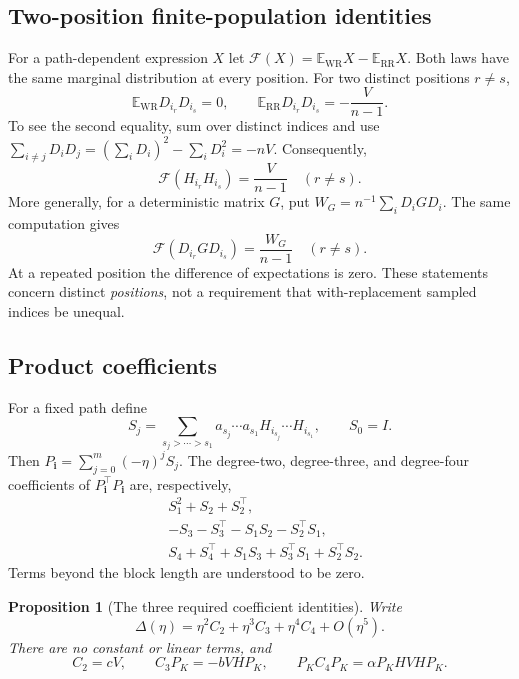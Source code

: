 \documentclass[11pt,letterpaper]{article}
\numberwithin{equation}{section}
\newtheorem{proposition}[theorem]{Proposition}
\theoremstyle{definition}
\newcommand{\E}{\mathbb E}
\newcommand{\WR}{\mathrm{WR}}
\newcommand{\RR}{\mathrm{RR}}
\newcommand{\calF}{\mathcal F}
\begin{document}
\subsection{Two-position finite-population identities}

For a path-dependent expression $X$ let $\calF(X)=\E_{\WR}X-\E_{\RR}X$. Both laws have the same marginal distribution at every position. For two distinct positions $r\ne s$,
\begin{equation}\label{eq:cov}
 \E_{\WR}D_{i_r}D_{i_s}=0,\qquad
 \E_{\RR}D_{i_r}D_{i_s}=-\frac{V}{n-1}.
\end{equation}
To see the second equality, sum over distinct indices and use
$\sum_{i\ne j}D_iD_j=(\sum_iD_i)^2-\sum_iD_i^2=-nV$.
Consequently,
\begin{equation}\label{eq:pair}
 \calF(H_{i_r}H_{i_s})=\frac{V}{n-1}\quad(r\ne s).
\end{equation}
More generally, for a deterministic matrix $G$, put $W_G=n^{-1}\sum_iD_iGD_i$. The same computation gives
\begin{equation}\label{eq:metriccov}
 \calF(D_{i_r}GD_{i_s})=\frac{W_G}{n-1}\quad(r\ne s).
\end{equation}
At a repeated position the difference of expectations is zero. These statements concern distinct \emph{positions}, not a requirement that with-replacement sampled indices be unequal.

\subsection{Product coefficients}

For a fixed path define
\[
 S_j=\sum_{s_j>\cdots>s_1}
 a_{s_j}\cdots a_{s_1}H_{i_{s_j}}\cdots H_{i_{s_1}},\qquad S_0=I.
\]
Then $P_{\bm i}=\sum_{j=0}^m(-\eta)^jS_j$. The degree-two, degree-three, and degree-four coefficients of $P_{\bm i}^\top P_{\bm i}$ are, respectively,
\begin{align}
 &S_1^2+S_2+S_2^\top,\label{eq:gram2}\\
 &-S_3-S_3^\top-S_1S_2-S_2^\top S_1,\label{eq:gram3}\\
 &S_4+S_4^\top+S_1S_3+S_3^\top S_1+S_2^\top S_2.\label{eq:gram4}
\end{align}
Terms beyond the block length are understood to be zero.

\begin{proposition}[The three required coefficient identities]\label{prop:coeff}
Write
\[
 \Delta(\eta)=\eta^2 C_2+\eta^3 C_3+\eta^4 C_4+O(\eta^5).
\]
There are no constant or linear terms, and
\begin{equation}\label{eq:keycoeff}
 C_2=cV,\qquad C_3P_K=-bVHP_K,\qquad
 P_KC_4P_K=\alpha P_KHVHP_K.
\end{equation}
\end{proposition}
\end{document}
